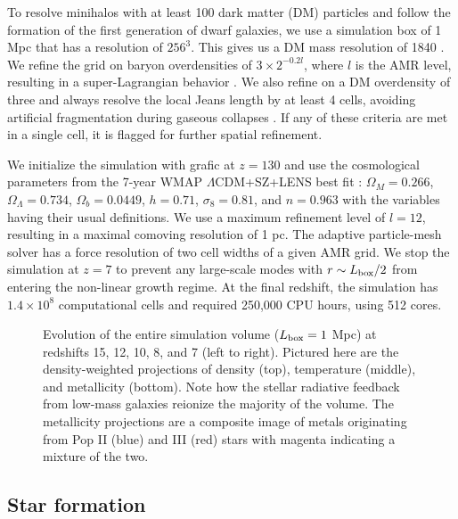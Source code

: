 \documentclass[apjl]{emulateapj}
\begin{document}
To resolve minihalos with at least 100 dark matter (DM) particles and
follow the formation of the first generation of dwarf galaxies, we use
a simulation box of 1 Mpc that has a resolution of $256^3$.  This
gives us a DM mass resolution of 1840 \Ms.  We refine the grid on
baryon overdensities of $3 \times 2^{-0.2l}$, where $l$ is the AMR
level, resulting in a super-Lagrangian behavior \citep[also
  see][]{OShea08}.  We also refine on a DM overdensity of three and
always resolve the local Jeans length by at least 4 cells, avoiding
artificial fragmentation during gaseous collapses \citep{Truelove97}.
If any of these criteria are met in a single cell, it is flagged for
further spatial refinement.

We initialize the simulation with grafic \citep{Bertschinger01} at $z
= 130$ and use the cosmological parameters from the 7-year WMAP
$\Lambda$CDM+SZ+LENS best fit \citep{WMAP7}: $\Omega_M = 0.266$,
$\Omega_\Lambda = 0.734$, $\Omega_b = 0.0449$, $h = 0.71$, $\sigma_8 =
0.81$, and $n = 0.963$ with the variables having their usual
definitions.  We use a maximum refinement level of $l = 12$, resulting
in a maximal comoving resolution of 1 pc.  The adaptive particle-mesh
solver has a force resolution of two cell widths of a given AMR grid.
We stop the simulation at $z=7$ to prevent any large-scale modes with
$r \sim L_{\rm box}/2$ from entering the non-linear growth regime.  At
the final redshift, the simulation has $1.4 \times 10^8$ computational
cells and required 250,000 CPU hours, using 512 cores.


\begin{figure*}
  \caption{\label{fig:evo-mosaic} Evolution of the entire simulation
    volume ($L_{\rm box} = 1$ Mpc) at redshifts 15, 12, 10, 8, and 7
    (left to right).  Pictured here are the density-weighted
    projections of density (top), temperature (middle), and
    metallicity (bottom).  Note how the stellar radiative feedback
    from low-mass galaxies reionize the majority of the volume.  The
    metallicity projections are a composite image of metals
    originating from Pop II (blue) and III (red) stars with magenta
    indicating a mixture of the two.}
\end{figure*}


\subsection{Star formation}
\end{document}
